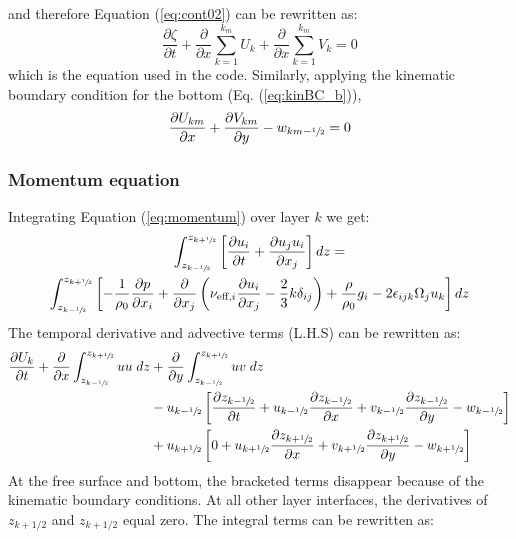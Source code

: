 and therefore Equation (\ref{eq:cont02}) can be rewritten as:
\begin{equation}
    \frac{\partial \zeta}{\partial t}+\frac{\partial }{\partial x}\sum_{k=1}^{k_m}U_k +\frac{\partial }{\partial x}\sum_{k=1}^{k_m}V_k  = 0
    \label{eq:cont03}
\end{equation}
which is the equation used in the code. Similarly, applying the kinematic boundary condition for the bottom (Eq. (\ref{eq:kinBC_b})),
\begin{equation}
    \frac{\partial U_{km}}{\partial x} +  \frac{\partial V_{km}}{\partial y} -  w_{km-\sfrac{1}{2}}  = 0
\end{equation}

\subsubsection{Momentum equation}
Integrating Equation (\ref{eq:momentum}) over layer $k$ we get:
\begin{multline}
    \int_{z_{k-\sfrac{1}{2}}}^{z_{k+\sfrac{1}{2}}} \left[ \frac{\partial u_i}{\partial t} +  \frac{\partial u_ju_i}{\partial x_j} \right] dz = \\  \int_{z_{k-\sfrac{1}{2}}}^{z_{k+\sfrac{1}{2}}} \left[-\frac{1}{\rho_0} \frac{\partial p}{\partial x_i} + \frac{\partial}{\partial x_j}\left( \nu_{\text{eff},i} \frac{\partial u_i}{\partial x_j}-\frac{2}{3}k \delta_{ij}\right) + \frac{\rho}{\rho_0}g_i - 2\epsilon_{ijk} \Omega_j u_k \right] dz
    \label{eq:momentumLI01}
\end{multline}
The temporal derivative and advective terms (L.H.S) can be rewritten as:
\begin{align}
   \frac{\partial U_k}{\partial t}+ \frac{\partial}{\partial x} \int_{z_{k-\sfrac{1}{2}}}^{z_{k+\sfrac{1}{2}}} uu \; dz  &+ \frac{\partial}{\partial y} \int_{z_{k-\sfrac{1}{2}}}^{z_{k+\sfrac{1}{2}}} uv \; dz  \notag\\
   &- u_{k-\sfrac{1}{2}}\left[\frac{\partial z_{k-\sfrac{1}{2}}}{\partial t}+u_{k-\sfrac{1}{2}} \frac{\partial z_{k-\sfrac{1}{2}}}{\partial x}+v_{k-\sfrac{1}{2}} \frac{\partial z_{k-\sfrac{1}{2}}}{\partial y}-w_{k-\sfrac{1}{2}}\right] \notag\\
   &+u_{k+\sfrac{1}{2}}\left[0+u_{k+\sfrac{1}{2}} \frac{\partial z_{k+\sfrac{1}{2}}}{\partial x}+v_{k+\sfrac{1}{2}} \frac{\partial z_{k+\sfrac{1}{2}}}{\partial y}-w_{k+\sfrac{1}{2}}\right]
\end{align}
At the free surface and bottom, the bracketed terms disappear because of the kinematic boundary conditions. At all other layer interfaces, the derivatives of $z_{k+1 / 2}$ and $z_{k+1 / 2}$ equal zero. The integral terms can be rewritten as:
